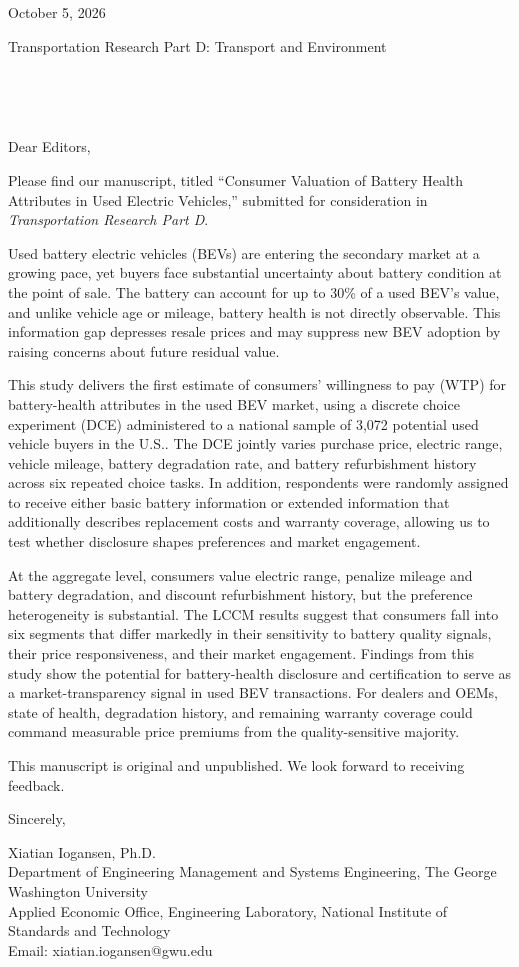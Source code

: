 \documentclass[a4paper,12pt]{article}
\begin{document}
October 5, 2026

Transportation Research Part D: Transport and Environment



~

~

Dear Editors,

Please find our manuscript, titled ``Consumer Valuation of Battery Health Attributes in Used Electric Vehicles,'' submitted for consideration in \textit{Transportation Research Part D}.

Used battery electric vehicles (BEVs) are entering the secondary market at a growing pace, yet buyers face substantial uncertainty about battery condition at the point of sale. The battery can account for up to 30\% of a used BEV's value, and unlike vehicle age or mileage, battery health is not directly observable. This information gap depresses resale prices and may suppress new BEV adoption by raising concerns about future residual value. 

This study delivers the first estimate of consumers' willingness to pay (WTP) for battery-health attributes in the used BEV market, using a discrete choice experiment (DCE) administered to a national sample of 3,072 potential used vehicle buyers in the U.S.. The DCE jointly varies purchase price, electric range, vehicle mileage, battery degradation rate, and battery refurbishment history across six repeated choice tasks. In addition, respondents were randomly assigned to receive either basic battery information or extended information that additionally describes replacement costs and warranty coverage, allowing us to test whether disclosure shapes preferences and market engagement.

At the aggregate level, consumers value electric range, penalize mileage and battery degradation, and discount refurbishment history, but the preference heterogeneity is substantial. The LCCM results suggest that consumers fall into six segments that differ markedly in their sensitivity to battery quality signals, their price responsiveness, and their market engagement. Findings from this study show the potential for battery-health disclosure and certification to serve as a market-transparency signal in used BEV transactions. For dealers and OEMs, state of health, degradation history, and remaining warranty coverage could command measurable price premiums from the quality-sensitive majority.

This manuscript is original and unpublished. We look forward to receiving feedback.

\vspace{2em}

Sincerely,

\vspace{1em}

Xiatian Iogansen, Ph.D.\\
Department of Engineering Management and Systems Engineering, The George Washington University\\
Applied Economic Office, Engineering Laboratory, National Institute of Standards and Technology\\
Email: xiatian.iogansen@gwu.edu
\end{document}
